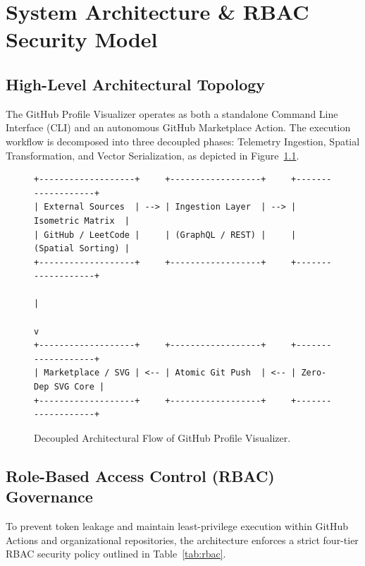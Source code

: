 \documentclass[12pt,a4paper]{report}
\begin{document}
\chapter{System Architecture \& RBAC Security Model}

\section{High-Level Architectural Topology}
The GitHub Profile Visualizer operates as both a standalone Command Line Interface (CLI) and an autonomous GitHub Marketplace Action. The execution workflow is decomposed into three decoupled phases: Telemetry Ingestion, Spatial Transformation, and Vector Serialization, as depicted in Figure~\ref{fig:arch}.

\begin{figure}[htbp]
\centering
\begin{verbatim}
+-------------------+     +------------------+     +-------------------+
| External Sources  | --> | Ingestion Layer  | --> | Isometric Matrix  |
| GitHub / LeetCode |     | (GraphQL / REST) |     | (Spatial Sorting) |
+-------------------+     +------------------+     +-------------------+
                                                             |
                                                             v
+-------------------+     +------------------+     +-------------------+
| Marketplace / SVG | <-- | Atomic Git Push  | <-- | Zero-Dep SVG Core |
+-------------------+     +------------------+     +-------------------+
\end{verbatim}
\caption{Decoupled Architectural Flow of GitHub Profile Visualizer.}
\label{fig:arch}
\end{figure}

\section{Role-Based Access Control (RBAC) Governance}
To prevent token leakage and maintain least-privilege execution within GitHub Actions and organizational repositories, the architecture enforces a strict four-tier RBAC security policy outlined in Table~\ref{tab:rbac}.
\end{document}
